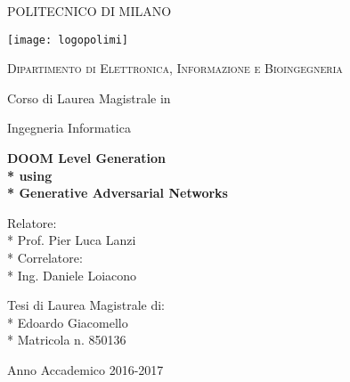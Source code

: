 \begin{titlepage}
	\centering
	
	{\scshape\LARGE POLITECNICO DI MILANO \par}\vspace{0.5cm}
		\texttt{[image: logopolimi]}\par
		\vspace{0.5cm}
	{\scshape\Large Dipartimento di Elettronica, Informazione e Bioingegneria \par}\vspace{1cm}
	\vspace{0.5cm}
	{\Large Corso di Laurea Magistrale in \par}
	{\Large Ingegneria Informatica \par}
	\vspace{1.5cm}
	{\huge\bfseries DOOM Level Generation \\* 
		using \\* Generative Adversarial Networks\par}
	\vspace{2cm}
	 
	\vfill
	\begin{flushleft}
		{\Large 
			Relatore: \\*
			Prof. Pier Luca Lanzi \\*
			Correlatore: \\*
			Ing. Daniele Loiacono
			\par}
	\end{flushleft}
	\begin{flushright}
		{\Large 
			Tesi di Laurea Magistrale di: \\*
			Edoardo Giacomello \\*
			Matricola n. 850136
		}
	\end{flushright}
	 
	\vfill

	{\large Anno Accademico 2016-2017\par}
\end{titlepage}